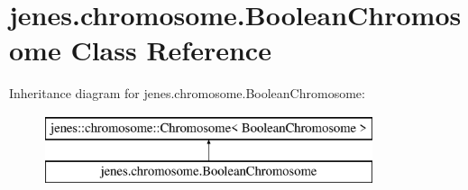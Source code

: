 \hypertarget{classjenes_1_1chromosome_1_1_boolean_chromosome}{\section{jenes.\-chromosome.\-Boolean\-Chromosome Class Reference}
\label{classjenes_1_1chromosome_1_1_boolean_chromosome}
}
Inheritance diagram for jenes.\-chromosome.\-Boolean\-Chromosome\-:\begin{figure}[H]
\begin{center}
\leavevmode
\includegraphics[height=2.000000cm]{classjenes_1_1chromosome_1_1_boolean_chromosome}
\end{center}
\end{figure}

